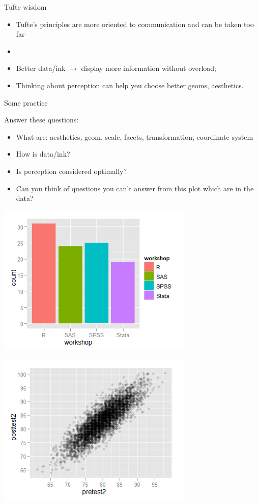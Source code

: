 \documentclass[xcolor=table,aspectratio=169]{beamer}
\begin{document}
\begin{frame}{Tufte wisdom}
  \begin{itemize}
  \item Tufte's principles are more oriented to communication and can be taken too far
    \item[]
  \item Better data/ink $\rightarrow$ display more information without overload;
    \item Thinking about perception can help you choose better geoms, aesthetics. 
    
  \end{itemize}
\end{frame}

\begin{frame}
  Some practice
\end{frame}


\begin{frame}Answer these questions:
  \begin{itemize}
  \item What are: aesthetics, geom, scale, facets, transformation, coordinate system
  \item How is data/ink?
  \item Is perception considered optimally?
   \item Can you think of questions you can't answer from this plot which are in the data?
  \end{itemize}
\end{frame}

\begin{frame}
  \includegraphics[width=0.7\textwidth]{pics/plot1.png}
\end{frame}


\begin{frame}
  \includegraphics[width=0.7\textwidth]{pics/plot2.png}
\end{frame}
\end{document}
